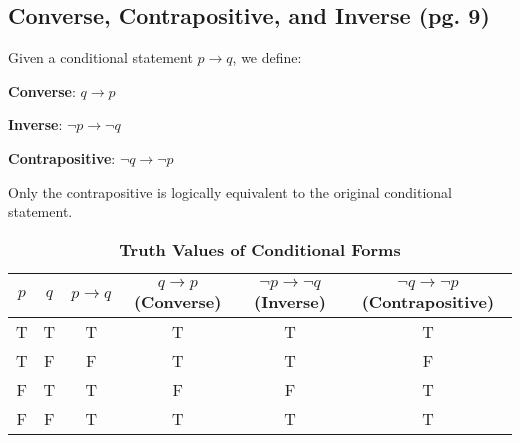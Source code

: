 \subsection*{Converse, Contrapositive, and Inverse (pg. 9)}

\vspace{5pt}
\begin{tcolorbox}[title=Definitions]
Given a conditional statement $p \rightarrow q$, we define:
\begin{center}
\textbf{Converse}: $q \rightarrow p$ 
\end{center}
\begin{center}
\textbf{Inverse}: $\neg p \rightarrow \neg q$
\end{center}
\begin{center}
\textbf{Contrapositive}: $\neg q \rightarrow \neg p$
\end{center}
Only the contrapositive is logically equivalent to the original conditional statement.
\end{tcolorbox}

\vspace{5pt}
\begin{table}[h!]
\centering
\caption*{\textbf{Truth Values of Conditional Forms}}
\begin{tabular}{|c|c!{\vrule width 1.5pt}c|c|c|c|}
\hline
{}
\textbf{$p$} & \textbf{$q$} & \textbf{$p \rightarrow q$} & \textbf{$q \rightarrow p$ (Converse)} & \textbf{$\neg p \rightarrow \neg q$ (Inverse)} & \textbf{$\neg q \rightarrow \neg p$ (Contrapositive)} \\
\hline
T & T & T & T & T & T \\
T & F & F & T & T & F \\
F & T & T & F & F & T \\
F & F & T & T & T & T \\
\hline
\end{tabular}
\end{table}

